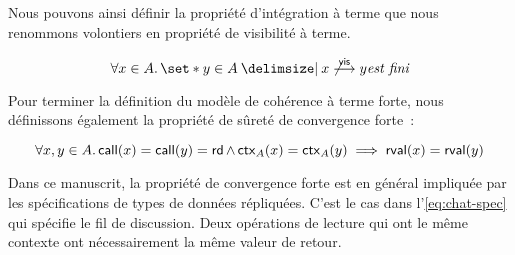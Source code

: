 

Nous pouvons ainsi définir la propriété d'intégration à terme que nous renommons volontiers en propriété de visibilité à terme.

\begin{equation}
    \forall x \in A \qsep \set*{y \in A \given x \not\vis y} \textit{est fini}
\end{equation}

Pour terminer la définition du modèle de cohérence à terme forte, nous définissons également la propriété de sûreté de convergence forte~:

\begin{equation}
    \forall x, y \in A \ldotp \operatorname{\mathsf{call}}(x) = \operatorname{\mathsf{call}}(y) = \operatorname{\mathsf{rd}} \land \operatorname{\mathsf{ctx}}_A(x) = \operatorname{\mathsf{ctx}}_A(y) \implies \operatorname{\mathsf{rval}}(x) = \operatorname{\mathsf{rval}}(y)
\end{equation}

Dans ce manuscrit, la propriété de convergence forte est en général impliquée par les spécifications de types de données répliquées.
C'est le cas dans l'\autoref{eq:chat-spec} qui spécifie le fil de discussion.
Deux opérations de lecture qui ont le même contexte ont nécessairement la même valeur de retour.



